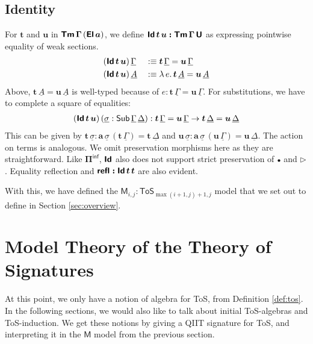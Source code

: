 \documentclass[sigplan,review,anonymous]{acmart}\settopmatter{printfolios=true,printccs=false,printacmref=false}
\newcommand{\ToS}{\mathsf{ToS}}
\newcommand{\ext}{\triangleright}
\newcommand{\emptycon}{\scaleobj{.75}\bullet}
\newcommand{\Piinf}{\Pi^{\mathsf{inf}}}
\newcommand{\bTm}{\boldsymbol{\Tm}}
\newcommand{\bGamma}{\boldsymbol{\Gamma}}
\newcommand{\bt}{\boldsymbol{t}}
\newcommand{\bu}{\boldsymbol{u}}
\newcommand{\ba}{\boldsymbol{a}}
\newcommand{\bU}{\boldsymbol{\U}}
\newcommand{\bEl}{\boldsymbol{\El}}
\newcommand{\bPiinf}{\boldsymbol{\Piinf}}
\newcommand{\bId}{\boldsymbol{\Id}}
\newcommand{\bM}{\boldsymbol{\mathsf{M}}}
\newcommand{\ul}[1]{\underline{#1}}
\newcommand{\ulGamma}{\ul{\Gamma}}
\newcommand{\ulDelta}{\ul{\Delta}}
\newcommand{\ulsigma}{\ul{\sigma}}
\newcommand{\ulA}{\ul{A}}
\begin{document}
\subsection{Identity}
For $\bt$ and $\bu$ in $\bTm\,\bGamma\,(\bEl\,\ba)$, we define $\bId\,\bt\,\bu
\boldsymbol{:} \bTm\,\bGamma\,\bU$ as expressing pointwise equality of weak
sections.
\begin{alignat*}{3}
& (\bId\,\bt\,\bu)\,\ulGamma &&:\equiv \bt\,\ulGamma = \bu\,\ulGamma\\
& (\bId\,\bt\,\bu)\,\ulA     && :\equiv \lambda\,e.\, \bt\,\ulA = \bu\,\ulA
\end{alignat*}
Above, $\bt\,\ulA = \bu\,\ulA$ is well-typed because of $e :
\bt\,\ulGamma = \bu\,\ulGamma$. For substitutions, we have to complete a square
of equalities:
\begin{alignat*}{3}
  (\bId\,\bt\,\bu)\,(\ulsigma : \Sub\,\ulGamma\,\ulDelta) : \bt\,\ulGamma = \bu\,\ulGamma \ra
       \bt\,\ulDelta = \bu\,\ulDelta
\end{alignat*}
This can be given by $\bt\,\ulsigma : \ba\,\ulsigma\,(\bt\,\ulGamma) =
\bt\,\ulDelta$ and $\bu\,\ulsigma : \ba\,\ulsigma\,(\bu\,\ulGamma) =
\bu\,\ulDelta$. The action on terms is analogous. We omit preservation morphisms
here as they are straightforward. Like $\bPiinf$, $\bId$ also does not support
strict preservation of $\emptycon$ and $\ext$. Equality reflection and $\boldsymbol{\refl :}
\bId\,\bt\,\bt$ are also evident.

With this, we have defined the $\bM_{i,j} : \ToS_{\max(i+1,j)+1, j}$ model that
we set out to define in Section \ref{sec:overview}.

\section{Model Theory of the Theory of Signatures}
\label{sec:tossig}

At this point, we only have a notion of algebra for ToS, from Definition
\ref{def:tos}. In the following sections, we would also like to talk about
initial ToS-algebras and ToS-induction. We get these notions by giving a QIIT
signature for ToS, and interpreting it in the $\bM$ model from the previous
section.
\end{document}
